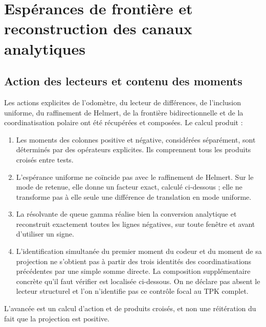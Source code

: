 \clearpage
\section[Espérances de frontière et reconstruction des canaux analytiques]{Espérances de frontière et\\reconstruction des canaux analytiques}
\label{sec:lectores-gamma}


\subsection{Action des lecteurs et contenu des moments}
\label{gamma-add-sub-5}

Les actions explicites de l'odomètre, du lecteur de différences, de l'inclusion uniforme, du raffinement de Helmert, de la frontière bidirectionnelle et de la coordinatisation polaire ont été récupérées et composées. Le calcul produit :

\begin{enumerate}
\item Les moments des colonnes positive et négative, considérées séparément, sont déterminés par des opérateurs explicites. Ils comprennent tous les produits croisés entre tests.
\item L'espérance uniforme ne coïncide pas avec le raffinement de Helmert. Sur le mode de retenue, elle donne un facteur exact, calculé ci-dessous ; elle ne transforme pas à elle seule une différence de translation en mode uniforme.
\item La résolvante de queue gamma réalise bien la conversion analytique et reconstruit exactement toutes les lignes négatives, sur toute fenêtre et avant d'utiliser un signe.
\item L'identification simultanée du premier moment du codeur et du moment de sa projection ne s'obtient pas à partir des trois identités des coordinatisations précédentes par une simple somme directe. La composition supplémentaire concrète qu'il faut vérifier est localisée ci-dessous. On ne déclare pas absent le lecteur structurel et l'on n'identifie pas ce contrôle focal au TPK complet.

\end{enumerate}
L'avancée est un calcul d'action et de produits croisés, et non une réitération du fait que la projection est positive.

